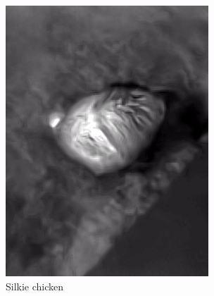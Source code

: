 \documentclass{l4proj}
\begin{document}
\begin{figure}[ht]
\begin{subfigure}[h!]{0.18\textwidth}
    \includegraphics[width=\textwidth, trim={0cm 1.6cm 0cm 1.6cm}, clip]{images/dataset/evil_chicken/lwir.png}
    \caption{Silkie chicken}
  \end{subfigure}
  \begin{subfigure}[h!]{0.18\textwidth}

\end{subfigure}
\end{figure}
\end{document}
